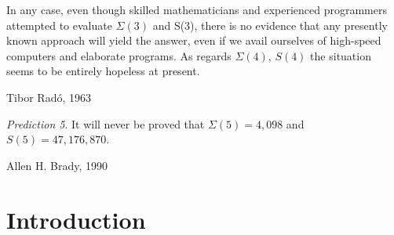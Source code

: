 \documentclass[a4paper,british]{article}
\theoremstyle{definition} %
\numberwithin{equation}{section}
\theoremstyle{definition} %
\newcommand{\BBtheFifth}{47{,}176{,}870}
\newcommand{\SigmaTheFifth}{4{,}098}
\newcommand{\radofull}{Tibor Rad\'o\xspace}
\begin{document}
\date{}

\maketitle

\vspace{-1em}
\begin{abstract}
    We prove that $S(5) = 47,176,870$ using the Coq proof assistant. The Busy Beaver value $S(n)$ is the maximum~number of steps that an n-state 2-symbol Turing machine can perform from the all-zero tape before halting, and $S$ was historically introduced by \radofull in 1962 as one of the simplest examples of an uncomputable function.  The proof enumerates 181,385,789 Turing machines with 5 states and, for each machine, decides whether it halts or not.
    Our result marks the first determination of a new Busy Beaver value in over 40 years and the first Busy Beaver value ever to be formally verified, attesting to the effectiveness of massively collaborative online research (\url{bbchallenge.org}).
\end{abstract}


\setcounter{tocdepth}{2}
\begingroup
\renewcommand{\baselinestretch}{0.9}\normalsize
\tableofcontents
\endgroup

\newpage

\begin{center}

\end{center}
\setlength{\epigraphwidth}{0.7\textwidth}
\epigraph{In any case, even though skilled mathematicians and experienced programmers attempted to evaluate $\Sigma(3)$ and S(3), there is no evidence that any presently known approach will yield the answer, even if we avail ourselves of high-speed computers and elaborate programs. As regards $\Sigma(4)$, $S(4)$ the situation seems to be entirely hopeless at present.}{\radofull, 1963 \cite{Rado_1963}}
\vspace{-1em}
\epigraph{\textit{Prediction 5}. It will never be proved that $\Sigma(5) = \SigmaTheFifth$ and $S(5) = \BBtheFifth$.}{Allen H. Brady, 1990 \cite{BradyMeaningOfLife}}
\vspace{2em}



\vspace{-40pt}

\section{Introduction}\label{sec:intro}
\end{document}

